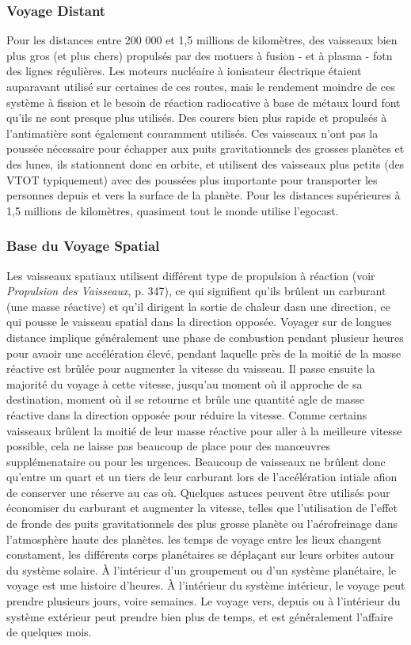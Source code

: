 \subsubsection{Voyage Distant} 

Pour les distances entre 200 000 et 1,5 millions de kilomètres, des vaisseaux bien plus gros (et plus chers) propulsés par des motuers à fusion - et à plasma - fotn des lignes régulières. Les moteurs nucléaire à ionisateur électrique étaient auparavant utilisé sur certaines de ces routes, mais le rendement moindre de ces système à fission et le besoin de réaction radiocative à base de métaux lourd font qu'ils ne sont presque plus utilisés. Des courers bien plus rapide et propulsés à l'antimatière sont également couramment utilisés. Ces vaisseaux n'ont pas la poussée nécessaire pour échapper aux puits gravitationnels des grosses planètes et des lunes, ils stationnent donc en orbite, et utilisent des vaisseaux plus petits (des VTOT typiquement) avec des poussées plus importante pour transporter les personnes depuis et vers la surface de la planète. Pour les distances supérieures à 1,5 millions de kilomètres, quasiment tout le monde utilise l'egocast. 

\subsubsection{Base du Voyage Spatial} 

Les vaisseaux spatiaux utilisent différent type de propulsion à réaction (voir \textit{Propulsion des Vaisseaux}, p. 347), ce qui signifient qu'ils brûlent un carburant (une masse réactive) et qu'il dirigent la sortie de chaleur dasn une direction, ce qui pousse le vaisseau spatial dans la direction opposée. Voyager sur de longues distance implique généralement une phase de combustion pendant plusieur heures pour avaoir une accélération élevé, pendant laquelle près de la moitié de la masse réactive est brûlée pour augmenter la vitesse du vaisseau. Il passe ensuite la majorité du voyage à cette vitesse, jusqu'au moment où il approche de sa destination, moment où il se retourne et brûle une quantité agle de masse réactive dans la direction opposée pour réduire la vitesse. Comme certains vaisseaux brûlent la moitié de leur masse réactive pour aller à la meilleure vitesse possible, cela ne laisse pas beaucoup de place pour des manœuvres supplémenataire ou pour les urgences. Beaucoup de vaisseaux ne brûlent donc qu'entre un quart et un tiers de leur carburant lors de l'accélération intiale afion de conserver une réserve au cas où. Quelques astuces peuvent être utilisés pour économiser du carburant et augmenter la vitesse, telles que l'utilisation de l'effet de fronde des puits gravitationnels des plus grosse planète ou l'aérofreinage dans l'atmosphère haute des planètes. les temps de voyage entre les lieux changent constament, les différents corps planétaires se déplaçant sur leurs orbites autour du système solaire. À l'intérieur d'un groupement ou d'un système planétaire, le voyage est une histoire d'heures. À l'intérieur du système intérieur, le voyage peut prendre plusieurs jours, voire semaines. Le voyage vers, depuis ou à l'intérieur du système extérieur peut prendre bien plus de temps, et est généralement l'affaire de quelques mois. 

